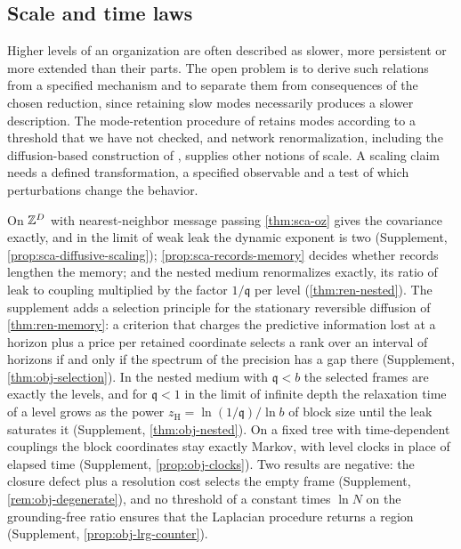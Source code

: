\subsection{Scale and time laws}\label{sec:opn-7}

Higher levels of an organization are often described as slower, more persistent or more extended than their parts. The open problem is to derive such relations from a specified mechanism and to separate them from consequences of the chosen reduction, since retaining slow modes necessarily produces a slower description. The mode-retention procedure of \citet{friston2021parcels} retains modes according to a threshold that we have not checked, and network renormalization, including the diffusion-based construction of \citet{villegas2023laplacian}, supplies other notions of scale. A scaling claim needs a defined transformation, a specified observable and a test of which perturbations change the behavior.

On $\mathbb{Z}^D$ with nearest-neighbor message passing \cref{thm:sca-oz} gives the covariance exactly, and in the limit of weak leak the dynamic exponent is two (Supplement, \cref{prop:sca-diffusive-scaling}); \cref{prop:sca-records-memory} decides whether records lengthen the memory; and the nested medium renormalizes exactly, its ratio of leak to coupling multiplied by the factor $1/\mathfrak q$ per level (\cref{thm:ren-nested}). The supplement adds a selection principle for the stationary reversible diffusion of \cref{thm:ren-memory}: a criterion that charges the predictive information lost at a horizon plus a price per retained coordinate selects a rank over an interval of horizons if and only if the spectrum of the precision has a gap there (Supplement, \cref{thm:obj-selection}). In the nested medium with $\mathfrak q<b$ the selected frames are exactly the levels, and for $\mathfrak q<1$ in the limit of infinite depth the relaxation time of a level grows as the power $z_{\mathrm H}=\ln(1/\mathfrak q)/\ln b$ of block size until the leak saturates it (Supplement, \cref{thm:obj-nested}). On a fixed tree with time-dependent couplings the block coordinates stay exactly Markov, with level clocks in place of elapsed time (Supplement, \cref{prop:obj-clocks}). Two results are negative: the closure defect plus a resolution cost selects the empty frame (Supplement, \cref{rem:obj-degenerate}), and no threshold of a constant times $\ln N$ on the grounding-free ratio ensures that the Laplacian procedure returns a region (Supplement, \cref{prop:obj-lrg-counter}).

